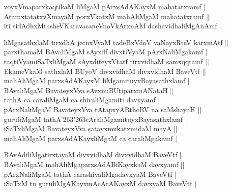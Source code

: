 \begin{entry}
\begin{shl}
voyxVmaparxkaqtikaM liMgaM pArxsAdAKayxM mahatatxramf |\\[2pt]
AtamxtatatxvXmayaM porxVkatxM mahAliMgaM mahatatxramf ||\\[2pt]
iti sidAdhxMtasheVKaravacaneVnoVkAtxnAM dashavidhaliMgAnAmf...\\[-1pt]
\end{shl}
\medskip
{}
\smallskip
{}
\smallskip
\begin{shl}
liMgasathxlaM tirxdhA jecnxVyaM tadeBxVdoV vaNayxRteV karxmAtf ||\\[2pt]
parxthamaM BAvaliMgaM sAyxdf divxtiVyaM pArxNaliMgakamf |\\[2pt]
taqtiVyamiSaTxliMgaM sAyxditeyxVtatf tirxvidhaM samxqqtamf ||\\[2pt]
EkameVkaM sathxlaM BUyoV divxvidhaM divxvidhaM BaveVtf ||\\[2pt]
mahAliMgaM parxsAdAKayxM liMgamituyxBayasathxlamf |\\[2pt]
BAvaliMgaM BavateyxVva sAvxnuBUtiparxmANataH ||\\[2pt]
tathA ca caraliMgaM ca shivaliMgamiti davxyamf |\\[2pt]
pArxNaliMgaM BavateyxVva tAtapxyARthoRV na saMshayaH ||\\[2pt]
guruliMgaM tathA{\char'263\char'263}cAraliMgamituyxBayasathxlamf |\\[2pt]
iSaTxliMgaM BavateyxVva satayxmukatxmidaM mayA ||\\[2pt]
mahAliMgaM parxsAdAKayxliMgaM ca caraliMgakamf |\\[-1pt]
\end{shl}
\medskip
{}
\smallskip
\begin{shl}
BAvAdiliMgatirxtayaM divxvidhaM divxvidhaM BaveVtf |\\[2pt]
BAvaliMgaM mahAliMgaparxsAdABiKayxkaM davxyamf ||\\[2pt]
pArxNaliMgaM tathA carashivaliMgadavxyaM BaveVtf |\\[2pt]
iSaTxM tu guruliMgAKayxmAcArAKayxM davxyaM BaveVtf |\\[-1pt]
\end{shl}
\medskip
{}
\smallskip
{}

\end{entry}
